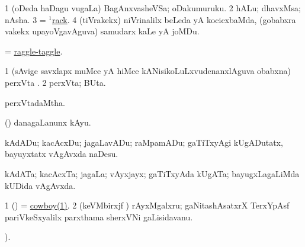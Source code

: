 \begin{center}
\bentry
{} 
\gl{\saMkiSx}
\expl{}
\bmng
{} 
\emng
\eentry

\bentry
{} 
\gl{\saMkiSx}
\expl{}
\bmng
{} 
\emng
\eentry

\bentry
{} 
\gl{\saMkiSx}
\expl{}
\bmng
{} 
\emng
\eentry

\bentry
{} 
\gl{\nA}
\expl{}
\bmng
\bnum
\num{1} (oDeda haDagu \mo vugaLa) BagAnxvasheVSa; oDakumuruku. 
\num{2} hALu; dhavxMsa; nAsha. 
\num{3} = \hyperref{kandict_r.pdf}{R}{rack(1)}{$^1$rack}. 
\num{4} (tiVrakekx) niVrinalilx beLeda yA kocicxbaMda, (gobabxra \mo vakekx upayoVgavAguva) samudarx kaLe yA joMDu. 
\enum
\emng
\eentry

\bentry
{} 
\gl{\saMkiSx}
\expl{}
\bmng
{} 
\emng
\eentry

\bentry
{} 
\gl{\gu}
\expl{}
\bmng
= \hyperref{kandict_r.pdf}{R}{raggle-taggle}{raggle-taggle}. 
\emng
\eentry

\bentry
{} 
\gl{\nA}
\expl{}
\bmng
\bnum
\num{1} (sAvige savxlapx muMce yA hiMce kANisikoLuLxvudenanxlAguva obabxna) perxVta \rUpa. 
\num{2} perxVta; BUta. 
\enum
\emng
\eentry

\bentry
{} 
\gl{\gu}
\expl{}
\bmng
perxVtadaMtha. 
\emng
\eentry

\bentry
{} 
\gl{\sakirx}
\bmng
(\ame) danagaLanunx kAyu. 
\emng

\noindent
\gl{\akirx}
\expl{}
\bmng
kAdADu; kacAcxDu; jagaLavADu; raMpamADu; gaTiTxyAgi kUgADutatx, bayuyxtatx vAgAvxda naDesu. 
\emng
\eentry

\bentry
{} 
\gl{\nA}
\expl{}
\bmng
kAdATa; kacAcxTa; jagaLa; vAyxjayx; gaTiTxyAda kUgATa; bayugxLagaLiMda kUDida vAgAvxda. 
\emng
\eentry

\bentry
{} 
\gl{\nA}
\expl{}
\bmng
\bnum
\num{1} (\ame) = \hyperref{kandict_c.pdf}{C}{cowboy(1)}{cowboy(1)}. 
\num{2} (keVMbirxjf \vivi) rAyxMgalxru; gaNitashAsatxrX TerxYpAsf  pariVkeSxyalilx parxthama sherxVNi gaLisidavanu. 
\enum
\emng
\eentry

\bentry
{} 
\gl{\kirx}
 ).


\end{center}
